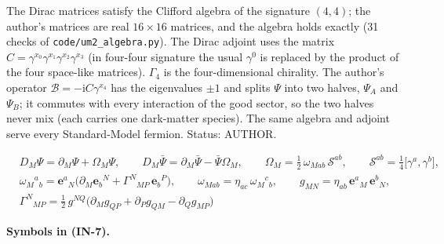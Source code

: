 \documentclass[
  10pt,
]{article}
\begin{document}
The Dirac matrices satisfy the Clifford algebra of the signature
\((4, 4)\); the author's matrices are real \(16 \times 16\) matrices,
and the algebra holds exactly (31 checks of
\texttt{code/um2\_algebra.py}). The Dirac adjoint uses the matrix
\(C = \gamma^{x_0}\gamma^{x_1}\gamma^{x_2}\gamma^{x_3}\) (in four-four
signature the usual \(\gamma^0\) is replaced by the product of the four
space-like matrices). \(\Gamma_4\) is the four-dimensional chirality.
The author's operator \(\mathcal{B} = -\mathrm{i}C\gamma^{x_4}\) has the
eigenvalues \(\pm1\) and splits \(\Psi\) into two halves, \(\Psi_A\) and
\(\Psi_B\); it commutes with every interaction of the good sector, so
the two halves never mix (each carries one dark-matter species). The
same algebra and adjoint serve every Standard-Model fermion. Status:
AUTHOR.

\[
\begin{aligned}
&D_M\Psi = \partial_M\Psi + \Omega_M\Psi,\qquad D_M\bar\Psi = \partial_M\bar\Psi - \bar\Psi\Omega_M,\qquad
 \Omega_M = \tfrac12\,\omega_{Mab}\,\mathcal{S}^{ab},\qquad \mathcal{S}^{ab} = \tfrac14\big[\gamma^a,
 \gamma^b\big],\\
&\omega_M{}^a{}_b = \mathbf{e}^a{}_N\big(\partial_M\mathbf{e}_b{}^N +
 \Gamma^N{}_{MP}\,\mathbf{e}_b{}^P\big),\qquad
 \omega_{Mab} = \eta_{ac}\,\omega_M{}^c{}_b,\qquad g_{MN} = \eta_{ab}\,\mathbf{e}^a{}_M\,\mathbf{e}^b{}_N,\\
&\Gamma^N{}_{MP} = \tfrac12\,g^{NQ}\big(\partial_Mg_{QP} + \partial_Pg_{QM} - \partial_Qg_{MP}\big)
\end{aligned} \tag{IN-7}
\]

\textbf{Symbols in (IN-7).}
\end{document}
